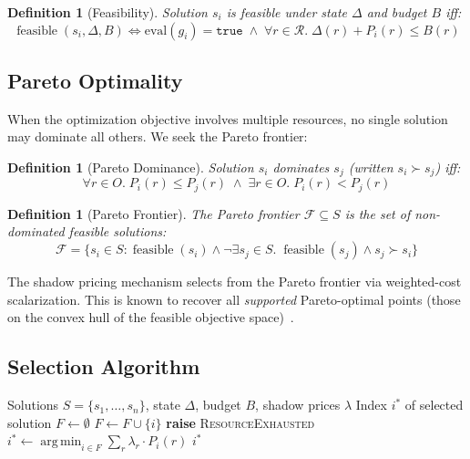 \documentclass[11pt,a4paper]{article}
\newtheorem{definition}[theorem]{Definition}
\DeclareMathOperator*{\argmin}{arg\,min}
\DeclareMathOperator{\feasible}{feasible}
\begin{document}
\begin{definition}[Feasibility]
Solution $s_i$ is \emph{feasible} under state $\Delta$ and budget $B$ iff:
\[
  \feasible(s_i, \Delta, B) \iff
    \mathrm{eval}(g_i) = \mathtt{true}
    \;\land\;
    \forall r \in \mathcal{R}.\; \Delta(r) + P_i(r) \leq B(r)
\]
\end{definition}

\subsection{Pareto Optimality}

When the optimization objective involves multiple resources, no single solution
may dominate all others.  We seek the Pareto frontier:

\begin{definition}[Pareto Dominance]
Solution $s_i$ \emph{dominates} $s_j$ (written $s_i \succ s_j$) iff:
\[
  \forall r \in O.\; P_i(r) \leq P_j(r)
  \;\land\;
  \exists r \in O.\; P_i(r) < P_j(r)
\]
\end{definition}

\begin{definition}[Pareto Frontier]
The Pareto frontier $\mathcal{F} \subseteq S$ is the set of non-dominated
feasible solutions:
\[
  \mathcal{F} = \{s_i \in S :
    \feasible(s_i) \land \neg\exists s_j \in S.\;
    \feasible(s_j) \land s_j \succ s_i\}
\]
\end{definition}

The shadow pricing mechanism selects from the Pareto frontier via weighted-cost
scalarization.  This is known to recover all \emph{supported} Pareto-optimal
points (those on the convex hull of the feasible objective space)~\cite{ehrgott2005}.

\subsection{Selection Algorithm}

\begin{algorithm}[t]
\caption{Adaptive Solution Selection}
\label{alg:selection}
\begin{algorithmic}[1]
\Require Solutions $S = \{s_1, \ldots, s_n\}$, state $\Delta$, budget $B$, shadow prices $\lambda$
\Ensure Index $i^*$ of selected solution
\State $F \gets \emptyset$ 
    \State $F \gets F \cup \{i\}$
  \EndIf
\EndFor
{}
  \State \textbf{raise} \textsc{ResourceExhausted}
\EndIf
\State $i^* \gets \argmin_{i \in F} \sum_{r} \lambda_r \cdot P_i(r)$
\State \Return $i^*$
\end{algorithmic}
\end{algorithm}
\end{document}
